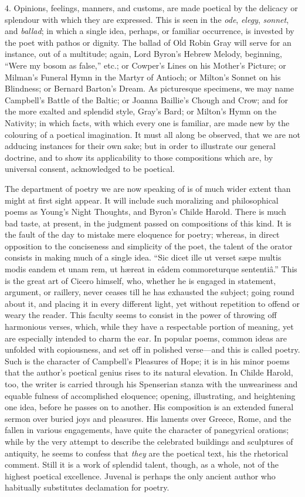 4. Opinions, feelings, manners, and customs, are made poetical by
the delicacy or splendour with which they are expressed. This is seen
in the \emph{ode}, \emph{elegy}, \emph{sonnet}, and \emph{ballad}; in
which a single idea, perhaps, or familiar occurrence, is invested by
the poet with pathos or dignity. The ballad of Old Robin Gray will
serve for an instance, out of a multitude; again, Lord Byron's Hebrew
Melody, beginning, ``Were my bosom as false,'' etc.; or
Cowper's Lines on his Mother's Picture; or Milman's Funeral Hymn in
the Martyr of Antioch; or Milton's Sonnet on his Blindness; or Bernard
Barton's Dream. As picturesque specimens, we may name Campbell's
Battle of the Baltic; or Joanna Baillie's Chough and Crow; and for the
more exalted and splendid style, Gray's Bard; or Milton's Hymn on the
Nativity; in which facts, with which every one is familiar, are made
new by the colouring of a poetical imagination. It must all along be
observed, that we are not adducing instances for their own sake; but
in order to illustrate our general doctrine, and to show its
applicability to those compositions which are, by universal consent,
acknowledged to be poetical.

The department of poetry we are now speaking of is of much wider
extent than might at first sight appear. It will include such
moralizing and philosophical poems as Young's Night Thoughts, and
Byron's Childe Harold. There is much bad taste, at present, in the
judgment passed on compositions of this kind. It is the fault of the
day to mistake mere eloquence for poetry; whereas, in direct
opposition to the conciseness and simplicity of the poet, the talent
of the orator consists in making much of a single idea. ``Sic
dicet ille ut verset sæpe multis modis eandem et unam rem, ut hæreat
in eâdem commoreturque sententiâ.'' This is the great art of
Cicero himself, who, whether he is engaged in statement, argument, or
raillery, never ceases till he has exhausted the subject; going round
about it, and placing it in every different light, yet without
repetition to offend or weary the reader. This faculty seems to
consist in the power of throwing off harmonious verses, which, while
they have a respectable portion of meaning, yet are especially
intended to charm the ear. In popular poems, common ideas are
unfolded with copiousness, and set off in polished verse—and this is
called poetry. Such is the character of Campbell's Pleasures of Hope;
it is in his minor poems that the author's poetical genius rises to
its natural elevation. In Childe Harold, too, the writer is carried
through his Spenserian stanza with the unweariness and equable fulness
of accomplished eloquence; opening, illustrating, and heightening one
idea, before he passes on to another. His composition is an extended
funeral sermon over buried joys and pleasures. His laments over
Greece, Rome, and the fallen in various engagements, have quite the
character of panegyrical orations; while by the very attempt to
describe the celebrated buildings and sculptures of antiquity, he
seems to confess that \emph{they} are the poetical text, his the
rhetorical comment. Still it is a work of splendid talent, though, as
a whole, not of the highest poetical excellence. Juvenal is perhaps
the only ancient author who habitually substitutes declamation for
poetry.

